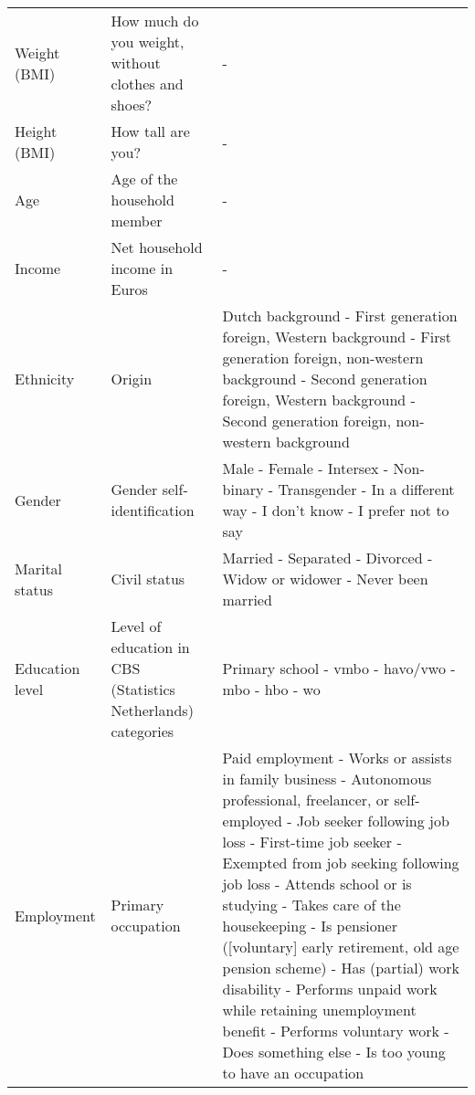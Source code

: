 \begin{table}[htbp]
\begin{tabularx}{\textwidth}{l|X|X}
Weight (BMI) & How much do you weight, without clothes and shoes? & - \\
Height (BMI) & How tall are you? & - \\
Age & Age of the household member & - \\
Income & Net household income in Euros & - \\
Ethnicity & Origin & Dutch background - First generation foreign, Western background - First generation foreign, non-western
background - Second generation foreign, Western background - Second generation foreign, non-western background \\
Gender & Gender self-identification & Male - Female - Intersex - Non-binary - Transgender - In a different way - I don't know -
I prefer not to say\footnotemark[1]\\
Marital status & Civil status & Married - Separated - Divorced - Widow or widower - Never been married \\
Education level & Level of education in CBS (Statistics Netherlands) categories & Primary school - vmbo - havo/vwo - mbo - hbo - wo \\
Employment & Primary occupation & Paid employment - Works or assists in family business - Autonomous professional, freelancer, or self-employed -
Job seeker following job loss - First-time job seeker - Exempted from job seeking following job loss - Attends school or is studying -
Takes care of the housekeeping - Is pensioner ([voluntary] early retirement, old age pension scheme) -
Has (partial) work disability - Performs unpaid work while retaining unemployment benefit -
Performs voluntary work - Does something else - Is too young to have an occupation
\end{tabularx}
\end{table}


